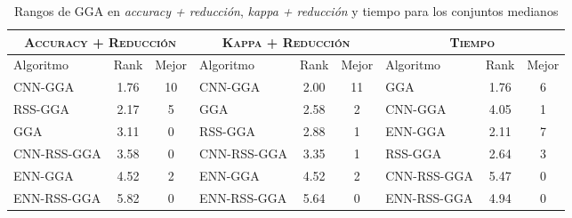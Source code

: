 \begin{table}[h!]
\centering
\begin{adjustbox}{max width =\textwidth}
\begin{tabular}{l c c|l c c|l c c}
\hline
\multicolumn{3}{c|}{\textsc{Accuracy + Reducción}}
	& \multicolumn{3}{c|}{\textsc{Kappa + Reducción}}
	& \multicolumn{3}{c}{\textsc{Tiempo}} \\
\hline
Algoritmo & Rank & Mejor & Algoritmo & Rank & Mejor & Algoritmo & Rank & Mejor \\
\hline
\hline

CNN-GGA     & 1.76 & 10 & CNN-GGA     & 2.00 & 11 & GGA         & 1.76 & 6 \\
RSS-GGA     & 2.17 & 5  & GGA         & 2.58 & 2  & CNN-GGA     & 4.05 & 1 \\
GGA         & 3.11 & 0  & RSS-GGA     & 2.88 & 1  & ENN-GGA     & 2.11 & 7 \\
CNN-RSS-GGA & 3.58 & 0  & CNN-RSS-GGA & 3.35 & 1  & RSS-GGA     & 2.64 & 3 \\
ENN-GGA     & 4.52 & 2  & ENN-GGA     & 4.52 & 2  & CNN-RSS-GGA & 5.47 & 0 \\
ENN-RSS-GGA & 5.82 & 0  & ENN-RSS-GGA & 5.64 & 0  & ENN-RSS-GGA & 4.94 & 0 \\


\hline
\end{tabular}
\end{adjustbox}
\caption{Rangos de GGA en \emph{accuracy + reducción}, \emph{kappa + reducción} y tiempo para los conjuntos medianos}
\label{rank-gga-med}
\end{table}




